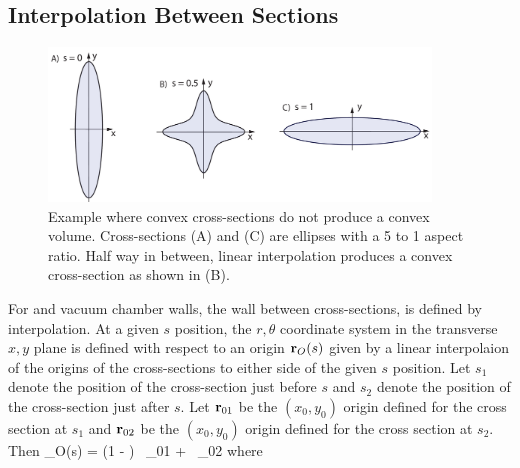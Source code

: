 \subsection{Interpolation Between Sections}
\label{s:wall.interpolation}

\begin{figure}[tb]
  \centering
  \includegraphics[width=4in]{concave-capillary.pdf}
  \caption[Convex cross-sections do not guarantee a convex volume.]
{Example where convex cross-sections do not produce a convex volume.
Cross-sections (A) and (C) are ellipses with a 5 to 1 aspect ratio.
Half way in between, linear interpolation produces a convex cross-section
as shown in (B).} 
  \label{f:concave.capillary}
\end{figure}

For  and vacuum chamber walls, the wall between
cross-sections, is defined by interpolation. At a given $s$ position,
the $r, \theta$ coordinate system in the transverse $x, y$ plane is
defined with respect to an origin ${\bf r}_O(s)$ given by a linear
interpolaion of the origins of the cross-sections to either side of the
given $s$ position. Let $s_1$ denote the position of the cross-section
just before $s$ and $s_2$ denote the position of the cross-section
just after $s$. Let ${\bf r}_{01}$ be the $(x_0, y_0)$ origin defined
for the cross section at $s_1$ and ${\bf r}_{02}$ be the $(x_0, y_0)$
origin defined for the cross section at $s_2$. Then
\Begineq
  \bfr_O(s) = (1 - \stilde) \, \bfr_{01} + \stilde \, \bfr_{02}
\Endeq
where 
\Begineq
  \stilde \equiv {}
\Endeq

